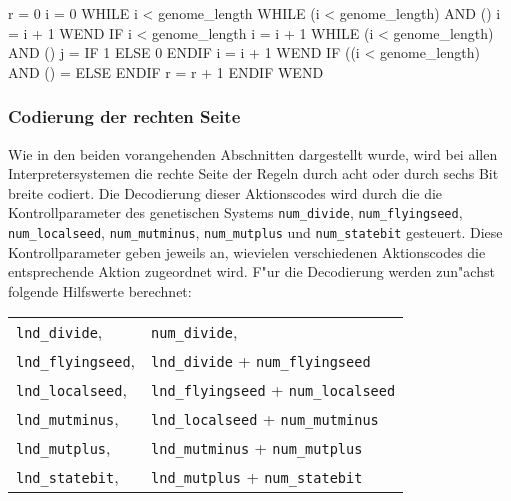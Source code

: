 \begin{verbatimcmd}
r = 0
i = 0
WHILE i < genome_length
  WHILE (i < genome_length) AND ()
    i = i + 1
  WEND
  IF i < genome_length
    i = i + 1
    WHILE (i < genome_length) AND ()
      j = 
      IF 
         1
      ELSE
         0
      ENDIF
      i = i + 1
    WEND
    IF ((i < genome_length) AND ()
       = 
    ELSE
    ENDIF
    r = r + 1
  ENDIF
WEND
\end{verbatimcmd}


\subsubsection{Codierung der rechten Seite}
\label{actioncodedef}

Wie in den beiden vorangehenden Abschnitten dargestellt wurde, wird
bei allen Interpretersystemen die rechte Seite der Regeln durch
acht oder durch sechs Bit breite  codiert. Die Decodierung
dieser Aktionscodes wird durch die 
die Kontrollparameter des genetischen Systems \verb|num_divide|,
\verb|num_flyingseed|, \verb|num_localseed|, \verb|num_mutminus|, \verb|num_mutplus|
und \verb|num_statebit| gesteuert. Diese Kontrollparameter geben jeweils an, wievielen
verschiedenen Aktionscodes die entsprechende Aktion zugeordnet wird.
F"ur die Decodierung werden zun"achst folgende Hilfswerte berechnet:

\medskip
\begin{tabular}{l@{ = }l}
\verb|lnd_divide|,     & \verb|num_divide|, \\
\verb|lnd_flyingseed|, & \verb|lnd_divide| + \verb|num_flyingseed| \\
\verb|lnd_localseed|,  & \verb|lnd_flyingseed| + \verb|num_localseed| \\
\verb|lnd_mutminus|,   & \verb|lnd_localseed| + \verb|num_mutminus| \\
\verb|lnd_mutplus|,    & \verb|lnd_mutminus| + \verb|num_mutplus| \\
\verb|lnd_statebit|,   & \verb|lnd_mutplus| + \verb|num_statebit| \\
\end{tabular}
\medskip

